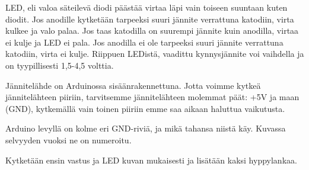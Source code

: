 \begin{tcolorbox}[title=LEDin kytkeminen,colback=blue!10,colbacktitle=purple!90]
LED, eli valoa säteilevä diodi päästää virtaa läpi vain toiseen suuntaan kuten diodit. Jos anodille kytketään tarpeeksi suuri jännite verrattuna katodiin, virta kulkee ja valo palaa. Jos taas katodilla on suurempi jännite kuin anodilla, virtaa ei kulje ja LED ei pala. Jos anodilla ei ole tarpeeksi suuri jännite verrattuna katodiin, virta ei kulje. Riippuen LEDistä, vaadittu kynnysjännite voi vaihdella ja on tyypillisesti 1,5-4,5 volttia. 
\end{tcolorbox}

\begin{tcolorbox}[title=Jännitelähteen kytkeminen]
Jännitelähde on Arduinossa sisäänrakennettuna. Jotta voimme kytkeä jännitelähteen piiriin, tarvitsemme jännitelähteen molemmat päät: +5V ja maan (GND), kytkemällä vain toinen piiriin emme saa aikaan haluttua vaikutusta.

Arduino levyllä on kolme eri GND-riviä, ja mikä tahansa niistä käy. Kuvassa selvyyden vuoksi ne on numeroitu.

\begin{minipage}{0.3\textwidth}
 \end{minipage}
\begin{minipage}{0.7\textwidth}
\end{minipage}
\end{tcolorbox}

Kytketään ensin vastus ja LED kuvan mukaisesti ja lisätään kaksi hyppylankaa.

